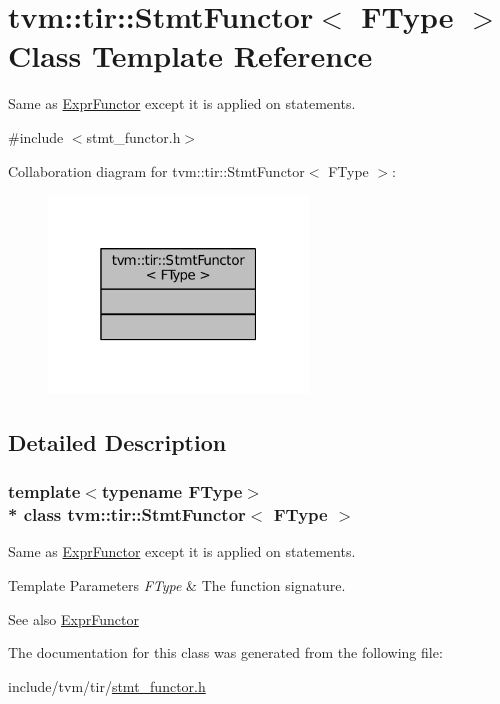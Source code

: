 \hypertarget{classtvm_1_1tir_1_1StmtFunctor}{}\section{tvm\+:\+:tir\+:\+:Stmt\+Functor$<$ F\+Type $>$ Class Template Reference}
\label{classtvm_1_1tir_1_1StmtFunctor}


Same as \hyperlink{classtvm_1_1tir_1_1ExprFunctor}{Expr\+Functor} except it is applied on statements.  




{\ttfamily \#include $<$stmt\+\_\+functor.\+h$>$}



Collaboration diagram for tvm\+:\+:tir\+:\+:Stmt\+Functor$<$ F\+Type $>$\+:
\nopagebreak
\begin{figure}[H]
\begin{center}
\leavevmode
\includegraphics[width=196pt]{classtvm_1_1tir_1_1StmtFunctor__coll__graph}
\end{center}
\end{figure}


\subsection{Detailed Description}
\subsubsection*{template$<$typename F\+Type$>$\\*
class tvm\+::tir\+::\+Stmt\+Functor$<$ F\+Type $>$}

Same as \hyperlink{classtvm_1_1tir_1_1ExprFunctor}{Expr\+Functor} except it is applied on statements. 


\begin{DoxyTemplParams}{Template Parameters}
{\em F\+Type} & The function signature. \\
\hline
\end{DoxyTemplParams}
\begin{DoxySeeAlso}{See also}
\hyperlink{classtvm_1_1tir_1_1ExprFunctor}{Expr\+Functor} 
\end{DoxySeeAlso}


The documentation for this class was generated from the following file\+:\begin{DoxyCompactItemize}
\item 
include/tvm/tir/\hyperlink{stmt__functor_8h}{stmt\+\_\+functor.\+h}\end{DoxyCompactItemize}
